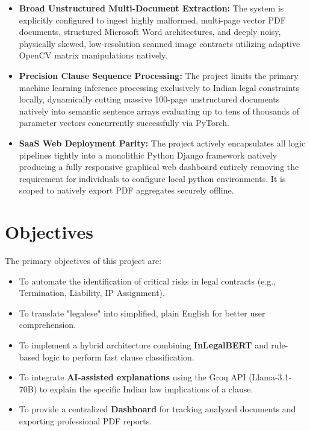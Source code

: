 \documentclass[a4paper,12pt]{report}
\begin{document}
\begin{itemize}
    \item \textbf{Broad Unstructured Multi-Document Extraction:} The system is explicitly configured to ingest highly malformed, multi-page vector PDF documents, structured Microsoft Word architectures, and deeply noisy, physically skewed, low-resolution scanned image contracts utilizing adaptive OpenCV matrix manipulations natively.
    \item \textbf{Precision Clause Sequence Processing:} The project limits the primary machine learning inference processing exclusively to Indian legal constraints locally, dynamically cutting massive 100-page unstructured documents natively into semantic sentence arrays evaluating up to tens of thousands of parameter vectors concurrently successfully via PyTorch.
    \item \textbf{SaaS Web Deployment Parity:} The project actively encapsulates all logic pipelines tightly into a monolithic Python Django framework natively producing a fully responsive graphical web dashboard entirely removing the requirement for individuals to configure local python environments. It is scoped to natively export PDF aggregates securely offline.
\end{itemize}

\section{Objectives}

The primary objectives of this project are:

\begin{itemize}
    \item To automate the identification of critical risks in legal contracts (e.g., Termination, Liability, IP Assignment).
    \item To translate "legalese" into simplified, plain English for better user comprehension.
    \item To implement a hybrid architecture combining \textbf{InLegalBERT} and rule-based logic to perform fast clause classification.
    \item To integrate \textbf{AI-assisted explanations} using the Groq API (Llama-3.1-70B) to explain the specific Indian law implications of a clause.
    \item To provide a centralized \textbf{Dashboard} for tracking analyzed documents and exporting professional PDF reports.
\end{itemize}
\end{document}

